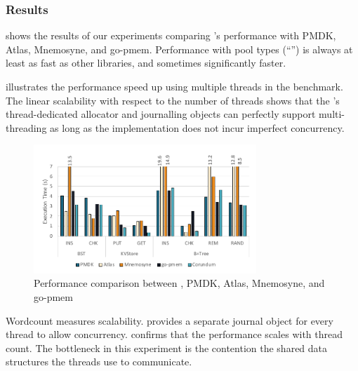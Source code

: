 \subsubsection{Results}
\label{sec:res:perf:res}


 shows the results of our experiments comparing \this{}'s performance with PMDK, Atlas, Mnemosyne, and go-pmem. 
Performance with pool types (``\this{}'') is always at least as fast as other libraries,
and sometimes significantly faster.

 illustrates the performance speed up using multiple threads in the  benchmark. The linear scalability with respect to the number of threads shows that the \this{}'s thread-dedicated allocator and journalling objects can perfectly support multi-threading as long as the implementation does not incur imperfect concurrency.

\begin{figure}
    \begin{center}
    \includegraphics[width=3.3in]{Graphs/perf.pdf}
    \end{center}
    \caption{\label{fig:perf} Performance comparison between \this{}, PMDK, Atlas, Mnemosyne, and go-pmem}
\end{figure}

Wordcount measures scalability.  \This{} provides
a separate journal object for every thread to allow concurrency. %
 confirms that the performance scales with thread count.  The bottleneck in this experiment is the contention the shared data structures the threads use to communicate.

